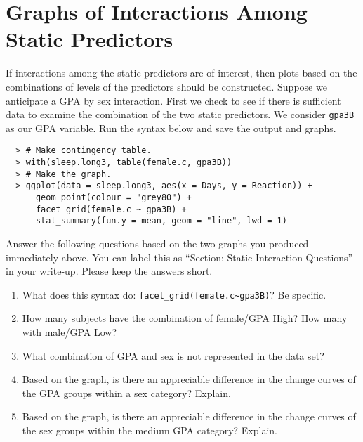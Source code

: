 \documentclass[]{article}
\begin{document}
%
%

\section*{Graphs of Interactions Among Static Predictors}

\noindent If interactions among the static predictors are of interest, then plots based on the combinations of levels of the predictors should be constructed. Suppose we anticipate a GPA by sex interaction. First we check to see if there is sufficient data to examine the combination of the two static predictors. We consider \texttt{gpa3B} as our GPA variable. Run the syntax below and save the output and graphs.

\begin{verbatim}
  > # Make contingency table.
  > with(sleep.long3, table(female.c, gpa3B))
  > # Make the graph.
  > ggplot(data = sleep.long3, aes(x = Days, y = Reaction)) +
      geom_point(colour = "grey80") +
      facet_grid(female.c ~ gpa3B) +
      stat_summary(fun.y = mean, geom = "line", lwd = 1)
\end{verbatim}

\noindent Answer the following questions based on the two graphs you produced immediately above. You can label this as ``Section: Static Interaction Questions'' in your write-up. Please keep the answers short.

\begin{enumerate}[resume]
\item What does this syntax do: \verb|facet_grid(female.c~gpa3B)|? Be specific. 
\item How many subjects have the combination of female/GPA High? How many with male/GPA Low? 
\item What combination of GPA and sex is not represented in the data set?
\item Based on the graph, is there an appreciable difference in the change curves of the GPA groups within a sex category? Explain. 
\item Based on the graph, is there an appreciable difference in the change curves of the sex groups within the medium GPA category? Explain. 
\end{enumerate}
\end{document}
